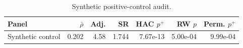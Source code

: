\begin{table}[t]
\centering
\small
\caption{Synthetic positive-control audit.}
\label{tab:synthetic-positive-control}
\begin{tabular}{lrrrrrr}
\toprule
Panel & $\bar\rho$ & Adj. & SR & HAC $p^+$ & RW $p$ & Perm. $p^+$ \\
\midrule
Synthetic control & 0.202 & 4.58 & 1.744 & 7.67e-13 & 5.00e-04 & 9.99e-04 \\
\bottomrule
\end{tabular}
\end{table}
